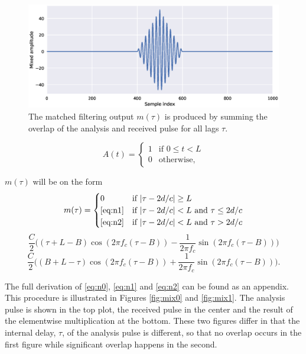\begin{figure}[t]
	\centering
	\includegraphics[scale=0.5]{figs_temp/mixing2}
	\caption{The matched filtering output $m(\tau)$ is produced by summing the overlap of the analysis and received pulse for all lags $\tau$.}
	\label{fig:mix2}
\end{figure}
\begin{equation}
	A(t) = \begin{cases}
		1 & \text{if $0\leq t < L$} \\
		0 & \text{otherwise},
	\end{cases}
\end{equation}

\noindent $m(\tau)$ will be on the form 
\begin{equation}\label{eq:n0}
	m(\tau) = 
	\begin{cases}
		0 & \text{if $|\tau-2d/c|\geq L$} \\
		\text{\eqref{eq:n1}} & \text{if $|\tau-2d/c|<L$ and $\tau \leq 2d/c$} \\
		\text{\eqref{eq:n2}} & \text{if $|\tau-2d/c|<L$ and $\tau > 2d/c$}
	\end{cases}
\end{equation}
\begin{equation}\label{eq:n1}
	\frac{C}{2}\Big((\tau + L - B)\cos(2\pi f_c(\tau - B)) 
	- \frac{1}{2\pi f_c}\sin(2\pi f_c(\tau - B))\Big)
\end{equation}
\begin{equation}\label{eq:n2}
	\frac{C}{2}\Big((B + L - \tau)\cos(2\pi f_c(\tau - B)) 
	+ \frac{1}{2\pi f_c}\sin(2\pi f_c(\tau - B))\Big).
\end{equation}

The full derivation of \eqref{eq:n0}, \eqref{eq:n1} and \eqref{eq:n2} can be found as an appendix. This procedure is illustrated in Figures \ref{fig:mix0} and \ref{fig:mix1}. The analysis pulse is shown in the top plot, the received pulse in the center and the result of the elementwise multiplication at the bottom. These two figures differ in that the internal delay, $\tau$, of the analysis pulse is different, so that no overlap occurs in the first figure while significant overlap happens in the second.

